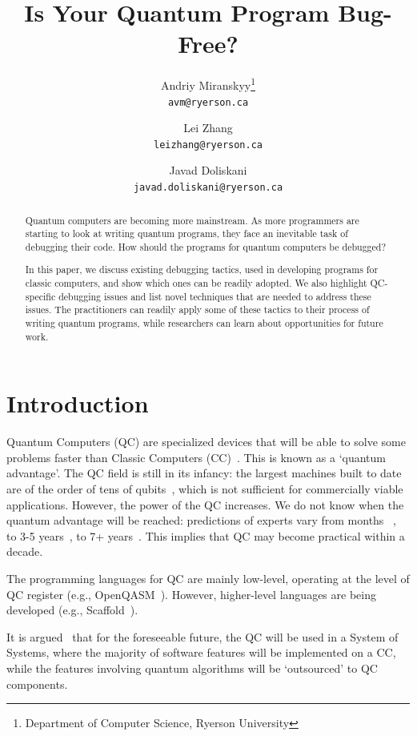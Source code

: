 \documentclass[11pt]{article}
\title{Is Your Quantum Program Bug-Free?}
\author{
	Andriy Miranskyy\thanks{Department of Computer Science, Ryerson University} \\
	\texttt{avm@ryerson.ca} 
	\and
	Lei Zhang\footnotemark[1] \\ 
	\texttt{leizhang@ryerson.ca}
	\and
	Javad Doliskani\footnotemark[1] \\ 
	\texttt{javad.doliskani@ryerson.ca}
}
\date{}
\theoremstyle{plain}
\theoremstyle{definition}
\begin{document}
\maketitle


\begin{abstract}
\noindent
Quantum computers are becoming more mainstream. As more programmers are starting to look at writing 
quantum programs, they face an inevitable task of debugging their code. How should the programs for 
quantum computers be debugged?

\noindent
In this paper, we discuss existing debugging tactics, used in developing programs for classic 
computers, and show which ones can be readily adopted. We also highlight QC-specific debugging 
issues and list novel techniques that are needed to address these issues. The practitioners can 
readily apply some of these tactics to their process of writing quantum programs, while researchers 
can learn about opportunities for future work.
\end{abstract}



\section{Introduction}\label{sec:intro}

Quantum Computers (QC) are specialized devices that will be able to solve some problems faster than 
Classic Computers (CC)~\cite{bernstein1997quantum, deutsch1985quantum}. This is known as a `quantum 
advantage'.
The QC field is still in its infancy: the largest machines built to date are of the order of tens 
of qubits~\cite{ibm_quantum,google2018}, which is not sufficient for commercially viable 
applications. However, the power of the QC increases. We do not know when the quantum advantage 
will be reached: predictions of experts vary from months ~\cite{Nevenlaw}, to 3-5 
years~\cite{ibm2022}, to 7+ years~\cite{mosca2018cybersecurity}. This implies that QC may become 
practical within a decade. 

The programming languages for QC are mainly low-level, operating at the level of QC register (e.g., 
OpenQASM~\cite{cross2017open}). However, higher-level languages are being developed (e.g., 
Scaffold~\cite{JavadiAbhari2014ScaffCC}). 

It is argued~\cite{miranskyy2019testing} that for the foreseeable future, the QC will be used in a 
System of Systems, where the majority of software features will be implemented on a CC, while the 
features involving quantum algorithms will be `outsourced' to QC components. 
\end{document}
